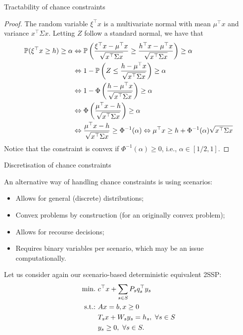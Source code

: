 \begin{frame}{Tractability of chance constraints}

	\begin{proof} 
		The random variable $\xi^\top x$ is a multivariate normal with mean $\mu^\top x$ and variance $x^\top\Sigma x$. Letting $Z$ follow a standard normal, we have that
		\vspace{-6pt}
		{\small
		\begin{align*} 
		 \mathbb{P}(\xi^\top x \ge h) \ge \alpha & \Leftrightarrow \mathbb{P}\left(\frac{\xi^\top x - \mu ^\top x}{\sqrt{x^\top \Sigma x}} \ge \frac{h^\top x - \mu ^\top x}{\sqrt{x^\top \Sigma x}} \right) \ge \alpha \\
		 & \Leftrightarrow 1 - \mathbb{P}\left( Z \le \frac{h - \mu ^\top x}{\sqrt{x^\top \Sigma x}} \right) \ge \alpha	\\
		 & \Leftrightarrow 1 - \Phi\left(\frac{h - \mu ^\top x}{\sqrt{x^\top \Sigma x}} \right)	\ge \alpha \\
		 & \Leftrightarrow \Phi\left(\frac{\mu ^\top x - h}{\sqrt{x^\top \Sigma x}} \right)	\ge \alpha\\
		 & \Leftrightarrow \frac{\mu ^\top x - h}{\sqrt{x^\top \Sigma x}} \ge \Phi^{-1}(\alpha) \Leftrightarrow \mu^\top x \ge h + \Phi^{-1}(\alpha)\sqrt{x^\top \Sigma x} \qedhere
		\end{align*}}
		Notice that the constraint is convex if $\Phi^{-1}(\alpha) \ge 0$, i.e., $\alpha \in [1/2, 1]$.
	\end{proof}
	
\end{frame}


\begin{frame}{Discretisation of chance constraints}

	An alternative way of handling chance constraints is using \alert{scenarios}:
	\begin{itemize}
		\item Allows for general (discrete) distributions;	
		\item \alert{Convex} problems by construction (for an originally convex problem);
		\item Allows for recourse decisions;
		\item Requires \alert{binary variables} per scenario, which may be an issue computationally.
	\end{itemize}
	
	\pause
	Let us consider again our scenario-based deterministic equivalent 2SSP:
	\begin{align*}
		\mathop{\text{min.} \ }  & c^\top x + \sum_{s\in S} P_s q_s^\top y_s \\
		\mathop{\text{s.t.:} \ }	   & Ax = b, x \ge 0 \\
			   & T_sx + W_s y_s = h_s, \ \forall s \in S \\
			   & y_s \ge 0, \ \forall s \in S.
	\end{align*}
\end{frame}



